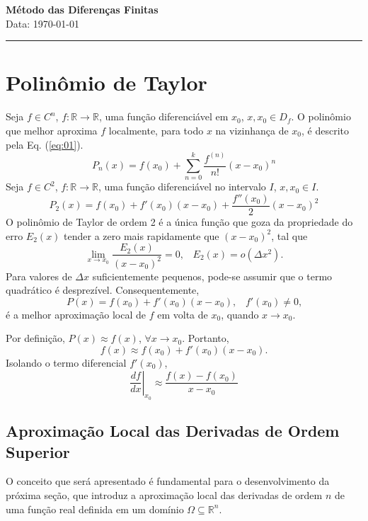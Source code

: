 \documentclass[11pt]{article}
\begin{document}
	
	\begin{center}
		\Large\textbf{Método das Diferenças Finitas} \\
		\normalsize
		Data: \today
	\end{center}
	
	\hrule
	\vspace{1em}
	
	\tableofcontents
	\newpage
	
	\section{Polinômio de Taylor}
	
	Seja $f \in C^n$, $f:\mathbb{R} \to \mathbb{R}$, uma função diferenciável em $x_0$, $x,x_0 \in D_f$. O polinômio que melhor aproxima $f$ localmente, para todo $x$ na vizinhança de $x_0$, é descrito pela Eq. (\ref{eq:01}).
	\begin{equation}
		P_n(x)=f(x_0)+\sum_{n=0}^{k}\frac{f^{(n)}}{n!}(x-x_0)^n
		\label{eq:01}
	\end{equation}
	Seja $f \in C^2$, $f:\mathbb{R} \to \mathbb{R}$, uma função diferenciável no intervalo $I$, $x,x_0 \in I$.
	\begin{equation}
		P_2(x)=f(x_0)+f'(x_0)(x-x_0)+\frac{f''(x_0)}{2}(x-x_0)^2
		\label{eq:02}
	\end{equation}
	O polinômio de Taylor de ordem 2 é a única função que goza da propriedade do erro $E_2(x)$ tender a zero mais rapidamente que $(x-x_0)^2$, tal que
	$$\lim_{x \to x_0} \frac{E_2(x)}{(x-x_0)^2}=0\text{,} \quad E_2(x)=o(\Delta x^2)\text{.}$$
	Para valores de $\Delta x$ suficientemente pequenos, pode-se assumir que o termo quadrático é desprezível. Consequentemente,
	$$P(x)=f(x_0)+f'(x_0)(x-x_0)\text{,} \quad f'(x_0) \neq 0\text{,}$$
	é a melhor aproximação local de $f$ em volta de $x_0$, quando $x \to x_0$. 
	
	Por definição, $P(x)\approx f(x)$, $\forall x \to x_0$. Portanto,
	$$f(x)\approx f(x_0)+f'(x_0)(x-x_0)\text{.}$$
	Isolando o termo diferencial $f'(x_0)$,
	\begin{equation}
		\left.\frac{df}{dx}\right|_{x_0}\approx \frac{f(x)-f(x_0)}{x-x_0}
		\label{eq:03}
	\end{equation}
	
	\subsection{Aproximação Local das Derivadas de Ordem Superior}
	\label{sec:1.1}
	O conceito que será apresentado é fundamental para o desenvolvimento da próxima seção, que introduz a aproximação local das derivadas de ordem $n$ de uma função real definida em um domínio $\Omega \subseteq \mathbb{R}^n$.
	
\end{document}
